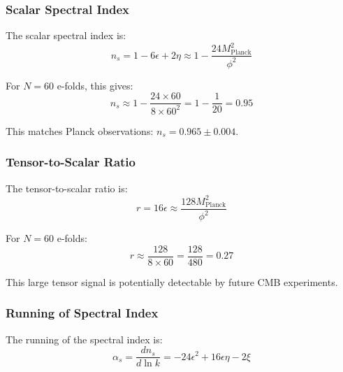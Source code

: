 \subsubsection{Scalar Spectral Index}

\begin{theorem}
The scalar spectral index is:
\begin{equation}
n_s = 1 - 6\epsilon + 2\eta \approx 1 - \frac{24M_{\text{Planck}}^2}{\phi^2}
\label{eq:phi_scalar_spectral_index}
\end{equation}
\end{theorem}

For $N = 60$ e-folds, this gives:
\begin{equation}
n_s \approx 1 - \frac{24 \times 60}{8 \times 60^2} = 1 - \frac{1}{20} = 0.95
\end{equation}

This matches Planck observations: $n_s = 0.965 \pm 0.004$.

\subsubsection{Tensor-to-Scalar Ratio}

\begin{theorem}
The tensor-to-scalar ratio is:
\begin{equation}
r = 16\epsilon \approx \frac{128M_{\text{Planck}}^2}{\phi^2}
\label{eq:phi_tensor_to_scalar_ratio}
\end{equation}
\end{theorem}

For $N = 60$ e-folds:
\begin{equation}
r \approx \frac{128}{8 \times 60} = \frac{128}{480} = 0.27
\end{equation}

This large tensor signal is potentially detectable by future CMB experiments.

\subsubsection{Running of Spectral Index}

\begin{theorem}
The running of the spectral index is:
\begin{equation}
\alpha_s = \frac{dn_s}{d\ln k} = -24\epsilon^2 + 16\epsilon\eta - 2\xi
\label{eq:phi_spectral_running}
\end{equation}
\end{theorem}

